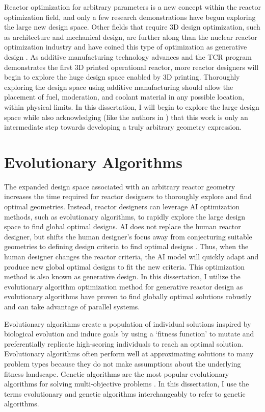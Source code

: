 Reactor optimization for arbitrary parameters is a new concept within the reactor 
optimization field, and only a few research demonstrations have begun exploring the 
large new design space.
Other fields that require 3D design optimization, such as architecture and mechanical 
design, are further along than the nuclear reactor optimization industry 
and have coined this type of optimization as generative design 
\cite{meintjes_generative_nodate}. 
As additive manufacturing technology advances and the \gls{TCR} program 
demonstrates the first 3D printed operational reactor, more reactor designers 
will begin to explore the huge design space enabled by 3D printing. 
Thoroughly exploring the design space using additive manufacturing should allow 
the placement of fuel, moderation, and coolant material in any possible location, 
within physical limits. 
In this dissertation, I will begin to explore the large design space while 
also acknowledging (like the authors in \cite{sobes_artificial_2020}) that 
this work is only an intermediate step towards developing a truly arbitrary 
geometry expression. 

\section{Evolutionary Algorithms} 
\label{sec:ea}
The expanded design space associated with an arbitrary reactor geometry increases 
the time required for reactor designers to thoroughly explore and find optimal 
geometries.
Instead, reactor designers can leverage \gls{AI} optimization methods, such as 
evolutionary algorithms, to rapidly explore the large design space to find global 
optimal designs. 
\gls{AI} does not replace the human reactor designer, but shifts the human 
designer's focus away from conjecturing suitable geometries to defining design 
criteria to find optimal designs \cite{sobes_artificial_2020}. 
Thus, when the human designer changes the reactor criteria, the \gls{AI} 
model will quickly adapt and produce new global optimal designs to fit the new 
criteria.  
This optimization method is also known as generative design. 
In this dissertation, I utilize the evolutionary algorithm optimization method 
for generative reactor design as evolutionary algorithms have proven to find globally 
optimal solutions robustly and can take advantage of parallel systems. 

Evolutionary algorithms create a population of individual solutions inspired 
by biological evolution and induce goals by using a `fitness function' to 
mutate and preferentially replicate high-scoring individuals to reach an 
optimal solution.
Evolutionary algorithms often perform well at approximating solutions to many 
problem types because they do not make assumptions about the 
underlying fitness landscape.
Genetic algorithms are the most popular evolutionary algorithms for solving 
multi-objective problems \cite{byrne_evolving_2014, krish_practical_2011}. 
In this dissertation, I use the terms evolutionary and genetic algorithms 
interchangeably to refer to genetic algorithms.

